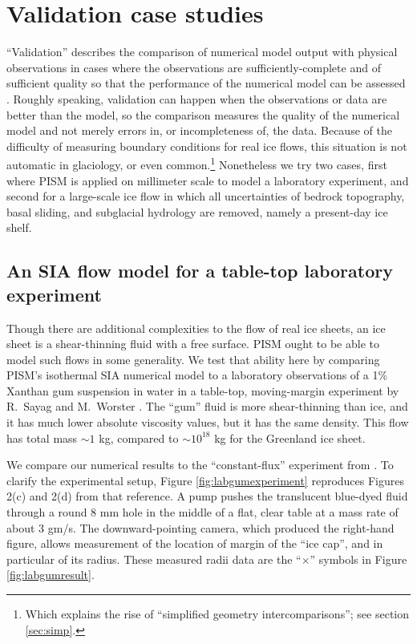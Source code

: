
\section{Validation case studies}\label{sec:validation} 

``Validation'' describes the comparison of numerical model output with physical observations in cases where the observations are sufficiently-complete and of sufficient quality so that the performance of the numerical model can be assessed \cite{Roache,Wesseling}.  Roughly speaking, validation can happen when the observations or data are better than the model, so the comparison measures the quality of the numerical model and not merely errors in, or incompleteness of, the data.  Because of the difficulty of measuring boundary conditions for real ice flows, this situation is not automatic in glaciology, or even common.\footnote{Which explains the rise of ``simplified geometry intercomparisons''; see section \ref{sec:simp}.}  Nonetheless we try two cases, first where PISM is applied on millimeter scale to model a laboratory experiment, and second for a large-scale ice flow in which all uncertainties of bedrock topography, basal sliding, and subglacial hydrology are removed, namely a present-day ice shelf.

\subsection{An SIA flow model for a table-top laboratory experiment}\label{sec:labgum}
 

Though there are additional complexities to the flow of real ice sheets, an ice sheet is a shear-thinning fluid with a free surface.  PISM ought to be able to model such flows in some generality.  We test that ability here by comparing PISM's isothermal SIA numerical model to a laboratory observations of a 1\% Xanthan gum suspension in water in a table-top, moving-margin experiment by R.~Sayag and M.~Worster \cite{SayagWorster2013,SayagPeglerWorster2012}.  The ``gum'' fluid is more shear-thinning than ice, and it has much lower absolute viscosity values, but it has the same density.  This flow has total mass $\sim 1$ kg, compared to $\sim 10^{18}$ kg for the Greenland ice sheet.

We compare our numerical results to the ``constant-flux'' experiment from \cite{SayagWorster2013}.  To clarify the experimental setup, Figure \ref{fig:labgumexperiment} reproduces Figures 2(c) and 2(d) from that reference.  A pump pushes the translucent blue-dyed fluid through a round 8 mm hole in the middle of a flat, clear table at a mass rate of about 3 gm/s.  The downward-pointing camera, which produced the right-hand figure, allows measurement of the location of margin of the ``ice cap'', and in particular of its radius.  These measured radii data are the ``$\times$'' symbols in Figure \ref{fig:labgumresult}.

